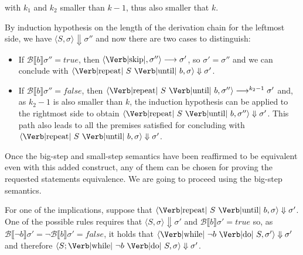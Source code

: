 \documentclass{article}
\begin{document}
\begin{enumerate}[2.]
    with $k_1$ and $k_2$ smaller than $k - 1$, thus also 
    smaller that $k$. 

    By induction hypothesis on the length
    of the derivation chain for the leftmost side, we have 
    $\langle S, \sigma \rangle \Downarrow \sigma''$ and now
    there are two cases to distinguish:

    \begin{itemize}
      \item If 
        $\mathcal{B} \llbracket b \rrbracket \sigma'' = true$,
        then 
        $
          \langle 
            \text{\Verb|skip|} , \sigma'' 
          \rangle \longrightarrow\sigma'
        $, so $\sigma' = \sigma''$ and we can conclude with
        $
          \langle 
            \text{\Verb|repeat| } S \text{ \Verb|until| } b,
            \sigma
          \rangle \Downarrow \sigma'
        $.
      \item If 
        $\mathcal{B} \llbracket b \rrbracket \sigma'' = false$,
        then
        $
          \langle 
            \text{\Verb|repeat| } S \text{ \Verb|until| } b,
            \sigma''
          \rangle \longrightarrow^{k_2 - 1} \sigma'
        $ and, as $k_2 - 1$ is also smaller than $k$, the 
        induction hypothesis can be applied to the rightmost
        side to obtain 
        $
          \langle 
            \text{\Verb|repeat| } S \text{ \Verb|until| } b,
            \sigma''
          \rangle \Downarrow \sigma'
        $. This path also leads to all the premises satisfied 
        for concluding with
        $
          \langle 
            \text{\Verb|repeat| } S \text{ \Verb|until| } b,
            \sigma
          \rangle \Downarrow \sigma'
        $.
    \end{itemize}

    Once the big-step and small-step semantics have been reaffirmed 
    to be equivalent even with this added construct, any of them 
    can be chosen for proving the requested statements equivalence. 
    We are going to proceed using the big-step semantics.

    For one of the implications, suppose that 
    $
      \langle 
        \text{\Verb|repeat| } S \text{ \Verb|until| } b,
        \sigma
      \rangle \Downarrow \sigma'
    $. One of the possible rules requires that
    $\langle S, \sigma \rangle \Downarrow \sigma'$ and
    $\mathcal{B}\llbracket b \rrbracket \sigma' = true$ so,
    as $
      \mathcal{B}\llbracket \neg b \rrbracket \sigma' = 
      \neg \mathcal{B}\llbracket  b \rrbracket \sigma' = false
    $, it holds that 
    $
      \langle 
        \text{\Verb|while| } \neg b \text{ \Verb|do| } S,
        \sigma' 
      \rangle \Downarrow \sigma'
    $ and therefore
    $
      \langle 
        S;\text{\Verb|while| } \neg b \text{ \Verb|do| } S,
        \sigma 
      \rangle \Downarrow \sigma'
    $.


\end{enumerate}
\end{document}
